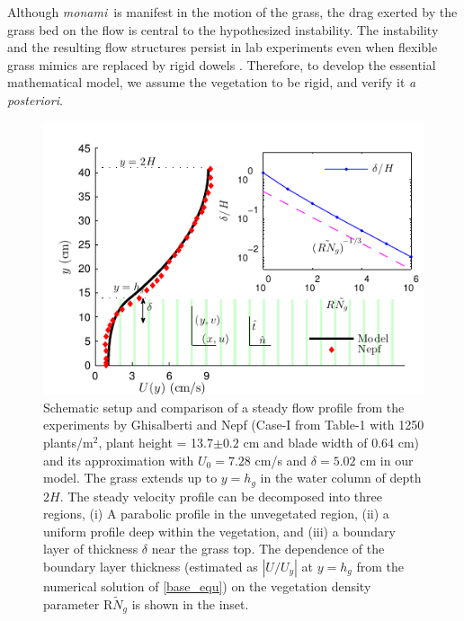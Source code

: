 \documentclass[aps,prl,twocolumn,superscriptaddress,10pt]{revtex4-1}  %
\newcommand{\hg}{h_g}
\newcommand{\Rey}{\text{R}}
\newcommand{\Ndg}{\tilde{N}_g}
\newcommand{\monami}{\textit{monami}}
\begin{document}
\newline
Although \monami ~is manifest in the motion of the grass, the drag exerted by the grass bed on the flow is central to the hypothesized instability. 
The instability and the resulting flow structures persist in lab experiments even when flexible grass mimics are replaced by rigid dowels \cite{Ghisal02}. 
Therefore, to develop the essential mathematical model, we assume the vegetation to be rigid, and verify it \textit{a posteriori}.
\begin{figure}
\includegraphics[scale=1]{Grass_Base_Nepf_shear}
\caption{Schematic setup and comparison of a steady flow profile from the experiments by Ghisalberti and Nepf \cite{Nepf04} (Case-I from Table-1 with 1250 plants/m$^2$, 
plant height = 13.7$\pm 0.2$ cm and blade width of 0.64 cm)
 and its approximation with $U_0=7.28$ cm/s and $\delta = 5.02$ cm in our model. The grass extends up to $y=h_g$ in the water column of depth $2H$. 
The steady velocity profile can be decomposed into three regions, (i) A parabolic profile in the unvegetated region, (ii) a uniform profile deep within the vegetation, and (iii) a boundary layer of thickness $\delta$ near the grass top. 
The dependence of the boundary layer thickness (estimated as $|U/U_y|$ at $y=\hg$ from the numerical solution of \eqref{base_equ}) on the vegetation density parameter $\Rey \Ndg$ is shown in the inset.}
\label{basicflow}
\end{figure}
\end{document}
